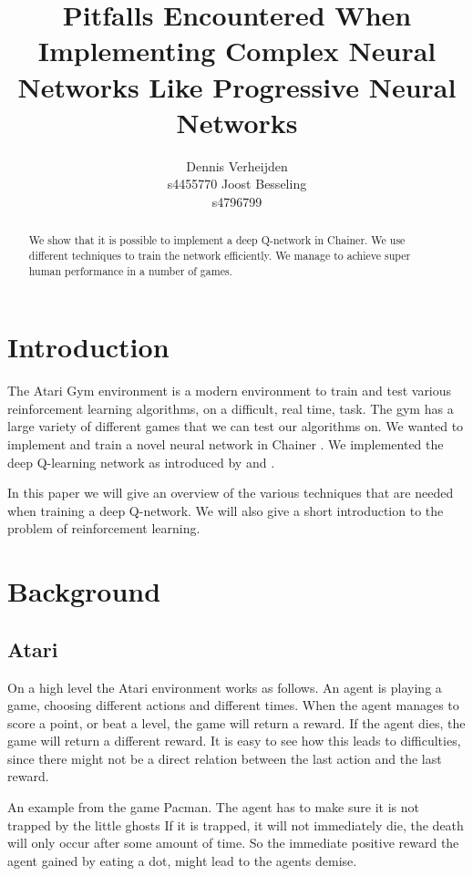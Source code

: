 \documentclass{article}
\title{Pitfalls Encountered When Implementing Complex Neural Networks Like Progressive Neural Networks}
\author{
  Dennis Verheijden\\
  s4455770
  \And
  Joost Besseling\\
  s4796799
}
\begin{document}

\maketitle

\begin{abstract}
  We show that it is possible to implement a deep Q-network in Chainer. We use different techniques to train the network efficiently. We manage to achieve super human performance in a number of games.
\end{abstract}

\section{Introduction}

The Atari Gym \cite{1606.01540} environment is a modern environment to train and test various reinforcement learning algorithms, on a difficult, real time, task. The gym has a large variety of different games that we can test our algorithms on. We wanted to implement and train a novel neural network in Chainer \cite{chainer_learningsys2015}. We implemented the deep Q-learning network as introduced by \cite{mnih2013playing} and \cite{mnih2015human}.

In this paper we will give an overview of the various techniques that are needed when training a deep Q-network. We will also give a short introduction to the problem of reinforcement learning.

\section{Background}

\subsection{Atari}

On a high level the Atari environment works as follows. An agent is playing a game, choosing different actions and different times. When the agent manages to score a point, or beat a level, the game will return a reward. If the agent dies, the game will return a different reward. It is easy to see how this leads to difficulties, since there might not be a direct relation between the last action and the last reward. 

An example from the game Pacman. The agent has to make sure it is not trapped by the little ghosts If it is trapped, it will not immediately die, the death will only occur after some amount of time. So the immediate positive reward the agent gained by eating a dot, might lead to the agents demise.
\end{document}
